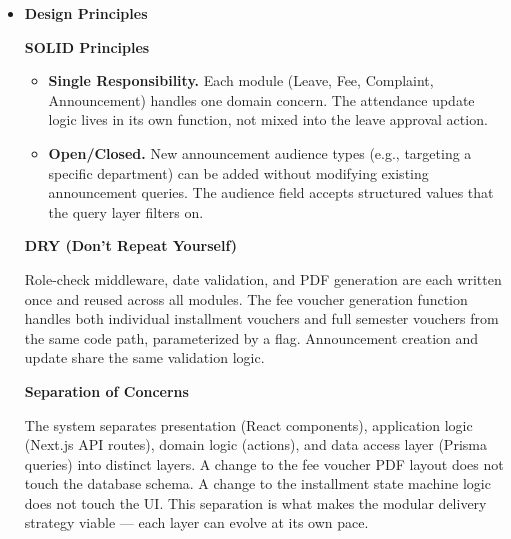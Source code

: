 \begin{itemize}
\begin{itemize}
      \item \textbf{Fee Installment:} \texttt{PENDING} $\to$ \texttt{LATE} $\to$
            \texttt{OVERDUE} $\to$ \texttt{PAID}. Transitions are time-driven; the
            system auto-advances status based on due dates.
    \end{itemize}

    Each transition is guarded by a permission check. A student cannot advance a leave from
    \texttt{PENDING\_HOD} to \texttt{APPROVED} — only the HOD can do that. These guards
    are defined once in the domain layer and enforced on every relevant API route.

        \item \textbf{Design Principles}

\textbf{SOLID Principles}

\begin{itemize}
  \item \textbf{Single Responsibility.} Each module (Leave, Fee, Complaint,
        Announcement) handles one domain concern. The attendance update logic
        lives in its own function, not mixed into the leave approval action.

  \item \textbf{Open/Closed.} New announcement audience types (e.g., targeting a
        specific department) can be added without modifying existing announcement
        queries. The audience field accepts structured values that the query layer
        filters on.

\end{itemize}

\textbf{DRY (Don't Repeat Yourself)}

Role-check middleware, date validation, and PDF generation are each written once and
reused across all modules. The fee voucher generation function handles both
individual installment vouchers and full semester vouchers from the same code path,
parameterized by a flag. Announcement creation and update share the same validation
logic.

\textbf{Separation of Concerns}

The system separates presentation (React components), application logic (Next.js API
routes), domain logic (actions), and data access layer (Prisma queries) into
distinct layers. A change to the fee voucher PDF layout does not touch the database
schema. A change to the installment state machine logic does not touch the UI. This
separation is what makes the modular delivery strategy viable — each layer can evolve
at its own pace.

\end{itemize}

